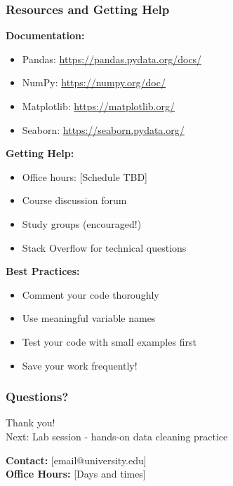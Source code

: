 \documentclass[aspectratio=169]{beamer}
\begin{document}
\begin{frame}
\frametitle{Resources and Getting Help}
\textbf{Documentation:}
\begin{itemize}
    \item Pandas: \url{https://pandas.pydata.org/docs/}
    \item NumPy: \url{https://numpy.org/doc/}
    \item Matplotlib: \url{https://matplotlib.org/}
    \item Seaborn: \url{https://seaborn.pydata.org/}
\end{itemize}

\textbf{Getting Help:}
\begin{itemize}
    \item Office hours: [Schedule TBD]
    \item Course discussion forum
    \item Study groups (encouraged!)
    \item Stack Overflow for technical questions
\end{itemize}

\textbf{Best Practices:}
\begin{itemize}
    \item Comment your code thoroughly
    \item Use meaningful variable names
    \item Test your code with small examples first
    \item Save your work frequently!
\end{itemize}
\end{frame}

\begin{frame}
\frametitle{Questions?}
\begin{center}
\Large Thank you!\\
\vspace{1em}
Next: Lab session - hands-on data cleaning practice

\vspace{2em}
\textbf{Contact:} [email@university.edu]\\
\textbf{Office Hours:} [Days and times]
\end{center}
\end{frame}
\end{document}
